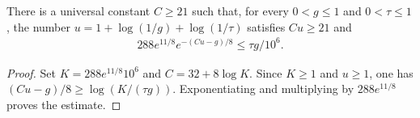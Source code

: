 \begin{lemma}
    \label{thm:independent_truncation_threshold_constant}
    \leanok
    There is a universal constant $C\ge21$ such that, for every
    $0<g\le1$ and $0<\tau\le1$, the number
    $u=1+\log(1/g)+\log(1/\tau)$ satisfies $Cu\ge21$ and
    \begin{align}
        288e^{11/8}e^{-(Cu-g)/8}\le\tau g/10^6.
        \label{eq:independent_truncation_uniform_tail}
    \end{align}
\end{lemma}
\begin{proof}
    \leanok
    Set $K=288e^{11/8}10^6$ and $C=32+8\log K$.
    Since $K\ge1$ and $u\ge1$, one has
    $(Cu-g)/8\ge\log(K/(\tau g))$.
    Exponentiating and multiplying by $288e^{11/8}$ proves the estimate.
\end{proof}
